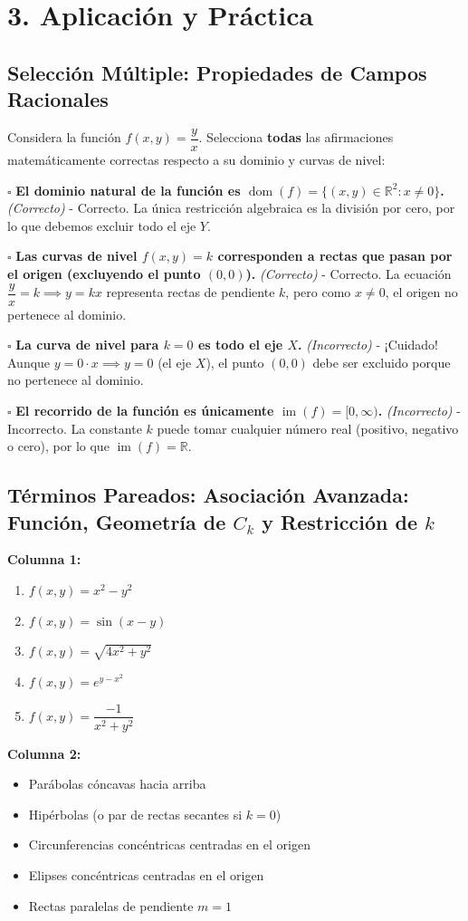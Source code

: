 \documentclass[11pt]{article}
\newenvironment{aplicacion}{%
  \section*{3. Aplicación y Práctica}%
}{}
\newenvironment{preguntacasillas}[1]{\subsection*{Selección Múltiple: #1}\par\vspace{0.1cm}}{\vspace{0.3cm}}
\newcommand{\casilla}[3]{\par\noindent $\square$ \textbf{#1} \textit{(#2)} - #3\par\vspace{0.15cm}}
\newenvironment{pareadostrescolumnas}[1]{\subsection*{Términos Pareados: #1}}{\vspace{0.3cm}}
\newcommand{\columnaI}[1]{\textbf{Columna 1:}\begin{enumerate}#1\end{enumerate}}
\newcommand{\columnaII}[1]{\textbf{Columna 2:}\begin{itemize}#1\end{itemize}}
\begin{document}
\begin{aplicacion}
  \begin{preguntacasillas}{Propiedades de Campos Racionales}
    Considera la función $f(x,y) = \dfrac{y}{x}$. Selecciona \textbf{todas} las afirmaciones matemáticamente correctas respecto a su dominio y curvas de nivel:
    
    \casilla{El dominio natural de la función es $\operatorname{dom}(f) = \{ (x,y) \in \mathbb{R}^2 \colon x \neq 0 \}$.}{Correcto}{Correcto. La única restricción algebraica es la división por cero, por lo que debemos excluir todo el eje $Y$.}
    \casilla{Las curvas de nivel $f(x,y) = k$ corresponden a rectas que pasan por el origen (excluyendo el punto $(0,0)$).}{Correcto}{Correcto. La ecuación $\dfrac{y}{x} = k \implies y = kx$ representa rectas de pendiente $k$, pero como $x \neq 0$, el origen no pertenece al dominio.}
    \casilla{La curva de nivel para $k = 0$ es todo el eje $X$.}{Incorrecto}{¡Cuidado! Aunque $y = 0 \cdot x \implies y = 0$ (el eje $X$), el punto $(0,0)$ debe ser excluido porque no pertenece al dominio.}
    \casilla{El recorrido de la función es únicamente $\operatorname{im}(f) = [0, \infty)$.}{Incorrecto}{Incorrecto. La constante $k$ puede tomar cualquier número real (positivo, negativo o cero), por lo que $\operatorname{im}(f) = \mathbb{R}$.}
  \end{preguntacasillas}

  \begin{pareadostrescolumnas}{Asociación Avanzada: Función, Geometría de $C_k$ y Restricción de $k$}
    
    \columnaI{
      \item $f(x,y) = x^2 - y^2$
      \item $f(x,y) = \sin(x - y)$
      \item $f(x,y) = \sqrt{4x^2 + y^2}$
      \item $f(x,y) = e^{y - x^2}$
      \item $f(x,y) = \dfrac{-1}{x^2 + y^2}$
    }
    
    \columnaII{
      \item Parábolas cóncavas hacia arriba
      \item Hipérbolas (o par de rectas secantes si $k=0$)
      \item Circunferencias concéntricas centradas en el origen
      \item Elipses concéntricas centradas en el origen
      \item Rectas paralelas de pendiente $m=1$
    }
    

\end{pareadostrescolumnas}
\end{aplicacion}
\end{document}
